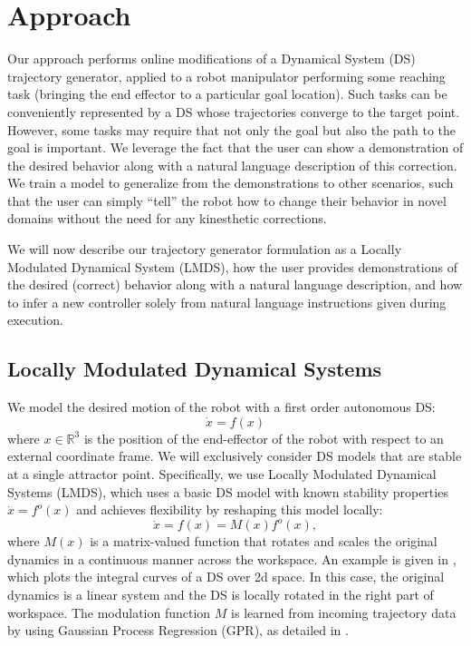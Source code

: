 
\section{Approach}
\label{sec:approach}

Our approach performs online modifications of a Dynamical System (DS) trajectory generator, applied to a robot manipulator performing some reaching task (bringing the end effector to a particular goal location).
Such tasks can be conveniently represented by a DS whose trajectories converge to the target point.
However, some tasks may require that not only the goal but also the path to the goal is important.
We leverage the fact that the user can show a demonstration of the desired behavior along with a natural language description of this correction.
We train a model to generalize from the demonstrations to other scenarios, such that the user can simply ``tell'' the robot how to change their behavior in novel domains without the need for any kinesthetic corrections.

We will now describe our trajectory generator formulation as a Locally Modulated Dynamical System (LMDS), how the user provides demonstrations of the desired (correct) behavior along with a natural language description, and how to infer a new controller solely from natural language instructions given during execution.

\subsection{Locally Modulated Dynamical Systems}

We model the desired motion of the robot with a first order autonomous DS:
\begin{equation}
  \label{eq:DS_general}
  \dot x = f(x)
\end{equation}
where $x \in \mathbb{R}^3$ is the position of the end-effector of the robot with respect to an external coordinate frame.
We will exclusively consider DS models that are stable at a single attractor point.
Specifically, we use Locally Modulated Dynamical Systems (LMDS), which uses a basic DS model with known stability properties $\dot x = f^o(x)$ and achieves flexibility by reshaping this model locally:
\begin{equation}
  \label{eq:DS_reshaped}
  \dot x = f(x) = M(x)f^o(x),
\end{equation}
where $M(x)$ is a matrix-valued function that rotates and scales the original dynamics in a continuous manner across the workspace.
An example is given in , which plots the integral curves of a DS over 2d space.
In this case, the original dynamics is a linear system and the DS is locally rotated in the right part of workspace.
The modulation function $M$ is learned from incoming trajectory data by using Gaussian Process Regression (GPR), as detailed in \cite{Kronander2015}.

